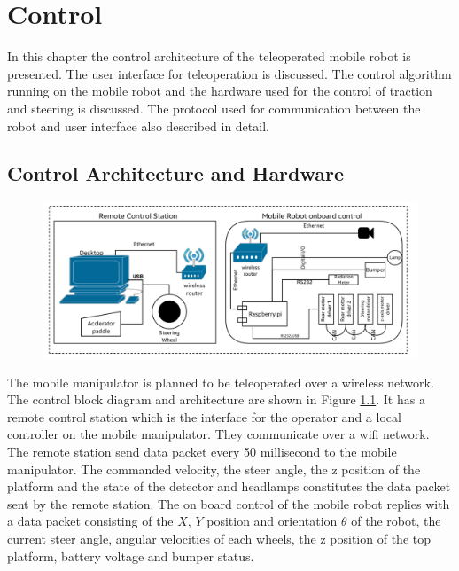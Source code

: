 \chapter{Control }
\label{c5_DI2}
In this chapter the control architecture of the teleoperated  mobile robot is presented. The user interface for teleoperation is discussed. The control algorithm  running on the mobile robot and the hardware used for the control of traction and steering is discussed. The protocol used  for communication between the robot and user interface also described in detail.
\section{Control Architecture and Hardware}


\begin{figure}
	\includegraphics[width=\linewidth,keepaspectratio]{Chapter3/fig/controlblock}
	\label{fig:ControlBlockDiag} 
\end{figure} 
The mobile manipulator is planned to be teleoperated over a wireless network. The control block diagram and architecture are shown in Figure \ref{fig:ControlBlockDiag}. It has a remote control station which is the interface for the operator and a local controller on the mobile manipulator. They  communicate over a wifi network. The remote station send data packet every 50 millisecond to the mobile manipulator. The commanded velocity, the steer angle, the z position of the platform and the state of the detector and headlamps constitutes the data packet sent by the remote station. The on board control of the mobile robot replies with a data packet consisting of the $X$, $Y$ position and orientation $\theta$ of the robot, the current steer angle, angular velocities of each wheels, the z position of the top platform,  battery voltage  and bumper status.

